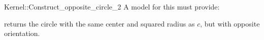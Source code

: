 \begin{ccRefFunctionObjectConcept}{Kernel::Construct_opposite_circle_2}
A model for this must provide:


{ returns the circle with the same center and squared radius as
  $c$, but with opposite orientation.}

\end{ccRefFunctionObjectConcept}
